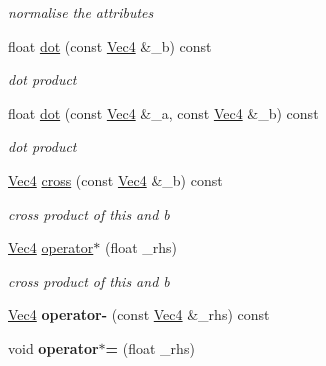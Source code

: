\begin{DoxyCompactItemize}
\begin{DoxyCompactList}\small\item\em normalise the attributes \item\end{DoxyCompactList}\item 
\hypertarget{classVec4_ab8b986ec7a01e1799479eb78efce0400}{
float \hyperlink{classVec4_ab8b986ec7a01e1799479eb78efce0400}{dot} (const \hyperlink{classVec4}{Vec4} \&\_\-b) const }
\label{classVec4_ab8b986ec7a01e1799479eb78efce0400}

\begin{DoxyCompactList}\small\item\em dot product \item\end{DoxyCompactList}\item 
\hypertarget{classVec4_a50c04fbd0dc31b35c90bf0327f25f493}{
float \hyperlink{classVec4_a50c04fbd0dc31b35c90bf0327f25f493}{dot} (const \hyperlink{classVec4}{Vec4} \&\_\-a, const \hyperlink{classVec4}{Vec4} \&\_\-b) const }
\label{classVec4_a50c04fbd0dc31b35c90bf0327f25f493}

\begin{DoxyCompactList}\small\item\em dot product \item\end{DoxyCompactList}\item 
\hyperlink{classVec4}{Vec4} \hyperlink{classVec4_ad8c09b1c096d065e117ffac51462bb0f}{cross} (const \hyperlink{classVec4}{Vec4} \&\_\-b) const 
\begin{DoxyCompactList}\small\item\em cross product of this and b \item\end{DoxyCompactList}\item 
\hyperlink{classVec4}{Vec4} \hyperlink{classVec4_a55ed28fa7c5f6c3582a929dbac9a7284}{operator$\ast$} (float \_\-rhs)
\begin{DoxyCompactList}\small\item\em cross product of this and b \item\end{DoxyCompactList}\item 
\hypertarget{classVec4_ae2579c5b5ce533033325ebd78bf3d544}{
\hyperlink{classVec4}{Vec4} {\bfseries operator-\/} (const \hyperlink{classVec4}{Vec4} \&\_\-rhs) const }
\label{classVec4_ae2579c5b5ce533033325ebd78bf3d544}

\item 
\hypertarget{classVec4_a59181be5e000a07b117390f887c54fa9}{
void {\bfseries operator$\ast$=} (float \_\-rhs)}
\label{classVec4_a59181be5e000a07b117390f887c54fa9}


\end{DoxyCompactItemize}
